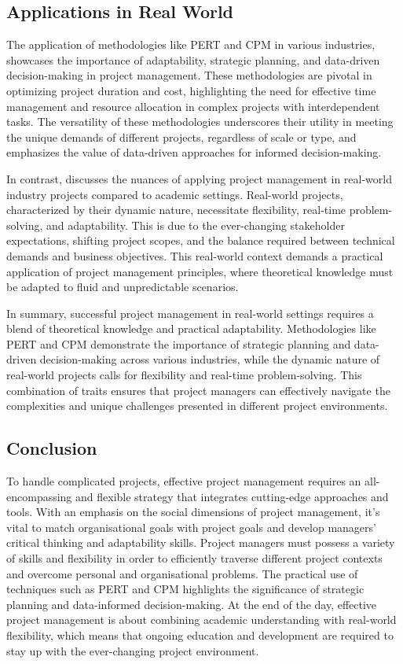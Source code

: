 \documentclass{article}
\begin{document}
\subsection{Applications in Real World}
The application of methodologies like PERT and CPM in various industries\cite{cicmil2006rethinking}, showcases the importance of adaptability, strategic planning, and data-driven decision-making in project management. These methodologies are pivotal in optimizing project duration and cost, highlighting the need for effective time management and resource allocation in complex projects with interdependent tasks. The versatility of these methodologies underscores their utility in meeting the unique demands of different projects, regardless of scale or type, and emphasizes the value of data-driven approaches for informed decision-making.

In contrast\cite{knudson2009software}, discusses the nuances of applying project management in real-world industry projects compared to academic settings. Real-world projects, characterized by their dynamic nature, necessitate flexibility, real-time problem-solving, and adaptability. This is due to the ever-changing stakeholder expectations, shifting project scopes, and the balance required between technical demands and business objectives. This real-world context demands a practical application of project management principles, where theoretical knowledge must be adapted to fluid and unpredictable scenarios.

In summary, successful project management in real-world settings requires a blend of theoretical knowledge and practical adaptability. Methodologies like PERT and CPM demonstrate the importance of strategic planning and data-driven decision-making across various industries, while the dynamic nature of real-world projects calls for flexibility and real-time problem-solving. This combination of traits ensures that project managers can effectively navigate the complexities and unique challenges presented in different project environments.

\subsection{Conclusion}

To handle complicated projects, effective project management requires an all-encompassing and flexible strategy that integrates cutting-edge approaches and tools. With an emphasis on the social dimensions of project management, it's vital to match organisational goals with project goals and develop managers' critical thinking and adaptability skills. Project managers must possess a variety of skills and flexibility in order to efficiently traverse different project contexts and overcome personal and organisational problems. The practical use of techniques such as PERT and CPM highlights the significance of strategic planning and data-informed decision-making. At the end of the day, effective project management is about combining academic understanding with real-world flexibility, which means that ongoing education and development are required to stay up with the ever-changing project environment.
\end{document}
